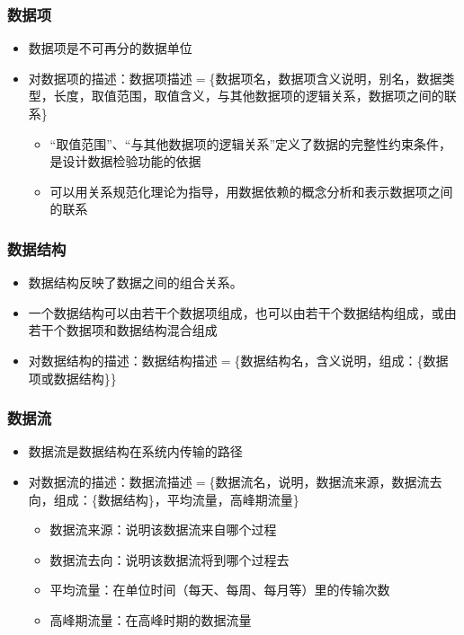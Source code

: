 \subsubsection{数据项}
\begin{itemize}
    \item 数据项是不可再分的数据单位
    \item 对数据项的描述：数据项描述$=$\{数据项名，数据项含义说明，别名，数据类型，长度，取值范围，取值含义，与其他数据项的逻辑关系，数据项之间的联系\}
    \begin{itemize}
        \item “取值范围”、“与其他数据项的逻辑关系”定义了数据的完整性约束条件，是设计数据检验功能的依据
        \item 可以用关系规范化理论为指导，用数据依赖的概念分析和表示数据项之间的联系
    \end{itemize}
\end{itemize}

\subsubsection{数据结构}
\begin{itemize}
    \item 数据结构反映了数据之间的组合关系。
    \item 一个数据结构可以由若干个数据项组成，也可以由若干个数据结构组成，或由若干个数据项和数据结构混合组成
    \item 对数据结构的描述：数据结构描述$=$\{数据结构名，含义说明，组成：\{数据项或数据结构\}\}
\end{itemize}

\subsubsection{数据流}
\begin{itemize}
    \item 数据流是数据结构在系统内传输的路径
    \item 对数据流的描述：数据流描述$=$\{数据流名，说明，数据流来源，数据流去向，组成：\{数据结构\}，平均流量，高峰期流量\}
    \begin{itemize}
        \item 数据流来源：说明该数据流来自哪个过程
        \item 数据流去向：说明该数据流将到哪个过程去
        \item 平均流量：在单位时间（每天、每周、每月等）里的传输次数
        \item 高峰期流量：在高峰时期的数据流量
    \end{itemize}
\end{itemize}

